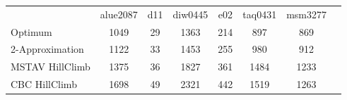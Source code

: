 \begin{tabular}[ht]{|l||c|c|c|c|c|c|H}
 & alue2087 & d11 & diw0445 & e02 & taq0431 & msm3277 & \\  
Optimum &1049 & 29 & 1363 & 214 & 897 & 869 & \\ 
2-Approximation &1122 & 33 & 1453 & 255 & 980 & 912 & \\ 
MSTAV HillClimb &1375 & 36 & 1827 & 361 & 1484 & 1233 & \\ 
CBC HillClimb &1698 & 49 & 2321 & 442 & 1519 & 1263 & \\ 
\end{tabular}